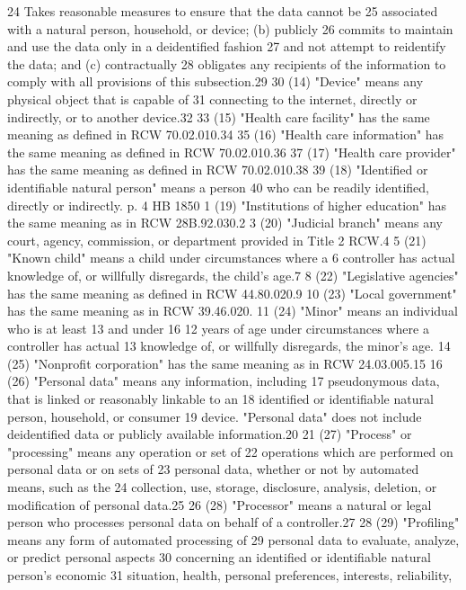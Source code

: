 24 Takes reasonable measures to ensure that the data cannot be
25 associated with a natural person, household, or device; (b) publicly
26 commits to maintain and use the data only in a deidentified fashion
27 and not attempt to reidentify the data; and (c) contractually
28 obligates any recipients of the information to comply with all
provisions of this subsection.29
30 (14) "Device" means any physical object that is capable of
31 connecting to the internet, directly or indirectly, or to another
device.32
33 (15) "Health care facility" has the same meaning as defined in
RCW 70.02.010.34
35 (16) "Health care information" has the same meaning as defined in
RCW 70.02.010.36
37 (17) "Health care provider" has the same meaning as defined in
RCW 70.02.010.38
39 (18) "Identified or identifiable natural person" means a person
40 who can be readily identified, directly or indirectly.
p. 4 HB 1850
1 (19) "Institutions of higher education" has the same meaning as
in RCW 28B.92.030.2
3 (20) "Judicial branch" means any court, agency, commission, or
department provided in Title 2 RCW.4
5 (21) "Known child" means a child under circumstances where a
6 controller has actual knowledge of, or willfully disregards, the
child's age.7
8 (22) "Legislative agencies" has the same meaning as defined in
RCW 44.80.020.9
10 (23) "Local government" has the same meaning as in RCW 39.46.020.
11 (24) "Minor" means an individual who is at least 13 and under 16
12 years of age under circumstances where a controller has actual
13 knowledge of, or willfully disregards, the minor's age.
14 (25) "Nonprofit corporation" has the same meaning as in RCW
24.03.005.15
16 (26) "Personal data" means any information, including
17 pseudonymous data, that is linked or reasonably linkable to an
18 identified or identifiable natural person, household, or consumer
19 device. "Personal data" does not include deidentified data or
publicly available information.20
21 (27) "Process" or "processing" means any operation or set of
22 operations which are performed on personal data or on sets of
23 personal data, whether or not by automated means, such as the
24 collection, use, storage, disclosure, analysis, deletion, or
modification of personal data.25
26 (28) "Processor" means a natural or legal person who processes
personal data on behalf of a controller.27
28 (29) "Profiling" means any form of automated processing of
29 personal data to evaluate, analyze, or predict personal aspects
30 concerning an identified or identifiable natural person's economic
31 situation, health, personal preferences, interests, reliability,
